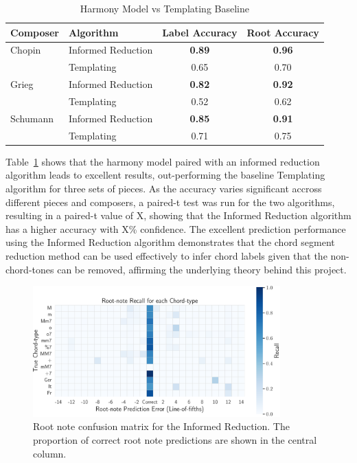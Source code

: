 \documentclass[12pt,a4paper,twoside,openany]{report} \usepackage[pdfborder={0 0 0}]{hyperref}    %
\theoremstyle{definition} \newtheorem{definition}{Definition}[section]
\begin{document}
\begin{table}[ht] 
\caption{Harmony Model vs Templating Baseline} 
\label{tab:informedReductions} 
\centering
\begin{tabular}{llcc}
\toprule
Composer       &          Algorithm  & Label Accuracy & Root Accuracy \\
\toprule
Chopin & Informed Reduction &     \textbf{0.89} & \textbf{0.96} \\
         & Templating &     0.65 & 0.70 \\
\midrule
Grieg & Informed Reduction &     \textbf{0.82} & \textbf{0.92} \\
         & Templating &     0.52 & 0.62 \\
\midrule
Schumann & Informed Reduction &     \textbf{0.85} & \textbf{0.91} \\
         & Templating &     0.71 & 0.75 \\
\bottomrule
\end{tabular}
\end{table}

Table~\ref{tab:informedReductions} shows that the harmony model paired with an informed reduction algorithm leads to
excellent results, out-performing the baseline Templating algorithm for three sets of pieces. As the accuracy varies
significant accross different pieces and composers, a paired-t test was run for the two algorithms, resulting in
a paired-t value of X, showing that the Informed Reduction algorithm has a higher accuracy with X\% confidence. 
The excellent prediction performance using the Informed Reduction algorithm demonstrates that the chord segment reduction method can be used effectively to infer chord labels given that the non-chord-tones can be removed, affirming the underlying theory behind this project.

  \begin{figure}[H]
    \begin{center}
      \includegraphics[width=0.85\textwidth]{figs/eval/Harmony/rootNoteHeatMap.pdf}
    \end{center}
    \caption{Root note confusion matrix for the Informed Reduction. The proportion of correct root note predictions are shown in the central
    column.}
    \label{fig:confusionRoot}
  \end{figure}
\end{document}
